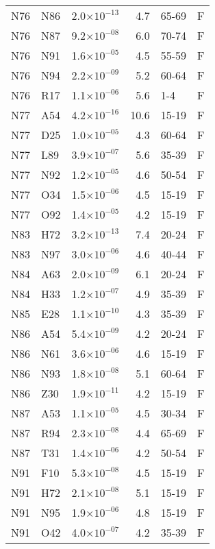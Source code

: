 \begin{longtable}{lllrll}
   N76 & N86 & 2.0$\times10^{-13}$ & 4.7 & 65-69 & F \\ 
   N76 & N87 & 9.2$\times10^{-08}$ & 6.0 & 70-74 & F \\ 
   N76 & N91 & 1.6$\times10^{-05}$ & 4.5 & 55-59 & F \\ 
   N76 & N94 & 2.2$\times10^{-09}$ & 5.2 & 60-64 & F \\ 
   N76 & R17 & 1.1$\times10^{-06}$ & 5.6 & 1-4 & F \\ 
   N77 & A54 & 4.2$\times10^{-16}$ & 10.6 & 15-19 & F \\ 
   N77 & D25 & 1.0$\times10^{-05}$ & 4.3 & 60-64 & F \\ 
   N77 & L89 & 3.9$\times10^{-07}$ & 5.6 & 35-39 & F \\ 
   N77 & N92 & 1.2$\times10^{-05}$ & 4.6 & 50-54 & F \\ 
   N77 & O34 & 1.5$\times10^{-06}$ & 4.5 & 15-19 & F \\ 
   N77 & O92 & 1.4$\times10^{-05}$ & 4.2 & 15-19 & F \\ 
   N83 & H72 & 3.2$\times10^{-13}$ & 7.4 & 20-24 & F \\ 
   N83 & N97 & 3.0$\times10^{-06}$ & 4.6 & 40-44 & F \\ 
   N84 & A63 & 2.0$\times10^{-09}$ & 6.1 & 20-24 & F \\ 
   N84 & H33 & 1.2$\times10^{-07}$ & 4.9 & 35-39 & F \\ 
   N85 & E28 & 1.1$\times10^{-10}$ & 4.3 & 35-39 & F \\ 
   N86 & A54 & 5.4$\times10^{-09}$ & 4.2 & 20-24 & F \\ 
   N86 & N61 & 3.6$\times10^{-06}$ & 4.6 & 15-19 & F \\ 
   N86 & N93 & 1.8$\times10^{-08}$ & 5.1 & 60-64 & F \\ 
   N86 & Z30 & 1.9$\times10^{-11}$ & 4.2 & 15-19 & F \\ 
   N87 & A53 & 1.1$\times10^{-05}$ & 4.5 & 30-34 & F \\ 
   N87 & R94 & 2.3$\times10^{-08}$ & 4.4 & 65-69 & F \\ 
   N87 & T31 & 1.4$\times10^{-06}$ & 4.2 & 50-54 & F \\ 
   N91 & F10 & 5.3$\times10^{-08}$ & 4.5 & 15-19 & F \\ 
   N91 & H72 & 2.1$\times10^{-08}$ & 5.1 & 15-19 & F \\ 
   N91 & N95 & 1.9$\times10^{-06}$ & 4.8 & 15-19 & F \\ 
   N91 & O42 & 4.0$\times10^{-07}$ & 4.2 & 35-39 & F \\ 

\end{longtable}
